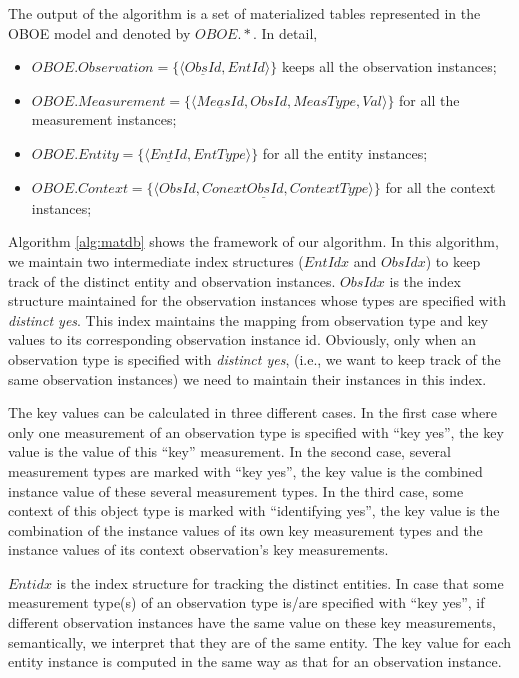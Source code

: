 \documentclass[10pt]{article}
\begin{document}
The output of the algorithm is a set of materialized tables represented in the OBOE model and denoted by $OBOE.*$. In detail,
\begin{itemize}
\item $OBOE.Observation=\{\langle \underline{ObsId}, EntId \rangle\}$ keeps all the observation instances;
\item $OBOE.Measurement=\{\langle \underline{MeasId}, ObsId, MeasType, Val\rangle\}$ for all the measurement instances;
\item $OBOE.Entity=\{\langle \underline{EntId}, EntType\rangle\}$ for all the entity instances;
\item $OBOE.Context =\{\langle \underline{ObsId, ConextObsId, ContextType}\rangle\}$ for all the context instances;
\end{itemize}

Algorithm \ref{alg:matdb} shows the framework of our algorithm. 
In this algorithm, we maintain two intermediate index structures ($EntIdx$ and $ObsIdx$) to keep track of the distinct entity and observation instances. 
$ObsIdx$ is the index structure maintained for the observation instances 
whose types are specified with {\em distinct yes}. 
This index maintains the mapping from observation type and key values to its corresponding observation instance id. 
Obviously, only when an observation type is specified with {\em distinct yes}, (i.e., we want to keep track of the same observation instances) we need to maintain their instances in this index. 

The key values can be calculated in three different cases.
In the first case where only one measurement of an observation type is specified with ``key yes'', the key value is the value of this ``key'' measurement.
 In the second case, several measurement types are marked with ``key yes'', the key value is the combined instance value of these several measurement types. 
In the third case, some context of this object type is marked with ``identifying yes'', the key value is the combination of the instance values of its own key measurement types and the instance values of its context observation's key measurements. 

$Entidx$ is the index structure for tracking the distinct entities. In case that some measurement type(s) of an observation type is/are specified with ``key yes'', 
if different observation instances have the same value on these key measurements, semantically, we interpret that they are of the same entity. 
The key value for each entity instance is computed in the same way as that for an observation instance.
\end{document}
